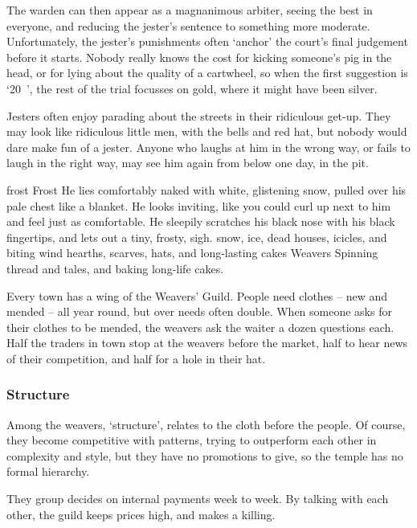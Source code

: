 \begin{multicols}{2}
The warden can then appear as a magnanimous arbiter, seeing the best in everyone, and reducing the jester's sentence to something more moderate.
Unfortunately, the jester's punishments often `anchor' the court's final judgement before it starts.
Nobody really knows the cost for kicking someone's pig in the head, or for lying about the quality of a cartwheel, so when the first suggestion is `20~', the rest of the trial focusses on gold, where it might have been silver.

Jesters often enjoy parading about the streets in their ridiculous get-up.
They may look like ridiculous little men, with the bells and red hat, but nobody would dare make fun of a jester.
Anyone who laughs at him in the wrong way, or fails to laugh in the right way, may see him again from below one day, in the pit.

  {\gls{frost}}%
  {Frost}%
  {
    He lies comfortably naked with white, glistening snow, pulled over his pale chest like a blanket.
    He looks inviting, like you could curl up next to him and feel just as comfortable.
    He sleepily scratches his black nose with his black fingertips, and lets out a tiny, frosty, {\sffamily sigh}.
  }%
  {snow, ice, dead houses, icicles, and biting wind}%
  {hearths, scarves, hats, and long-lasting cakes}%
  {Weavers}%
  {
    Spinning thread and tales, and baking long-life cakes.
  }%

Every town has a wing of the Weavers' Guild.
People need clothes -- new and mended -- all year round, but over needs often double.
When someone asks for their clothes to be mended, the weavers ask the waiter a dozen questions each.
Half the traders in town stop at the weavers before the market, half to hear news of their competition, and half for a hole in their hat.

\subsubsection{Structure}

Among the weavers, `structure', relates to the cloth before the people.
Of course, they become competitive with patterns, trying to outperform each other in complexity and style, but they have no promotions to give, so the temple has no formal hierarchy.

They group decides on internal payments week to week.
By talking with each other, the guild keeps prices high, and makes a killing.


\end{multicols}
